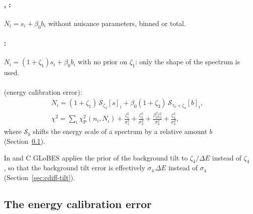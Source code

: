 \paragraph{, :}
$N_i = s_i+\beta_0 b_i$ without nuisance parameters, binned or total.

\paragraph{:} $N_i = (1+\zeta_1)s_i + \beta_0b_i$ with no prior
on $\zeta_1$: only the shape of the spectrum is used.

\paragraph{} (energy calibration error):
\begin{gather}
N_i = (1+\zeta_1)\,\mathcal S_{\zeta_2}[s]_i + \beta_0(1+\zeta_3)\,\mathcal S_{\tau_0+\zeta_4}[b]_i,
\label{eq:calib}\\
\chi^2 = \sum_i\chi^2_\text{P}(n_i,N_i) + \frac{\zeta_1^2}{\sigma_1^2} + \frac{\zeta_2^2}{\sigma_2^2}
  + \frac{\beta_0^2\zeta_3^2}{\sigma_3^2} + \frac{\zeta_4^2}{\sigma_4^2},
\end{gather}
where $\mathcal S_b$ shifts the energy scale of a spectrum by a relative amount
$b$ (Section~\ref{sec:escale}).

\begin{cdiff}
In  and  C GLoBES applies the
prior of the background tilt to $\zeta_4/\Delta E$ instead of $\zeta_4$, so that
the background tilt error is effectively $\sigma_4\,\Delta E$ instead of
$\sigma_4$ (Section~\ref{sec:cdiff-tilt}).
\end{cdiff}

\subsection{The energy calibration error}\label{sec:escale}

